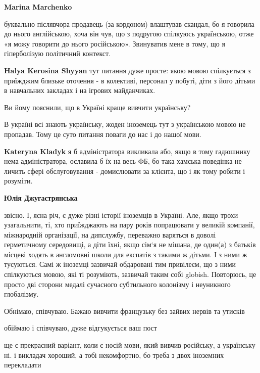 \begin{itemize}
\begin{itemize}
\textbf{Marina Marchenko} 

буквально післявчора продавець (за кордоном) влаштував скандал, бо я говорила
до нього англійською, хоча він чув, що з подругою спілкуюсь українською, отже
«я можу говорити до нього російською». Звинуватив мене в тому, що я
гіперболізую політичний контекст.


\textbf{Halya Kerosina Shyyan} тут питання дуже просте: якою мовою спілкується з приїжджим близьке оточення - в колективі, персонал у побуті, діти з його дітьми в навчальних закладах і на ігрових майданчиках.

Ви йому пояснили, що в Україні краще вивчити українську?

В україні всі знають українську, жоден іноземець тут з українською мовою не пропадав. Тому це суто питання поваги до нас і до нашої мови.

\textbf{Kateryna Kladyk} я б адміністратора викликала або, якщо в тому гадюшнику нема адміністратора, ославила б їх на весь ФБ, бо така хамська поведінка не личить сфері обслуговування - домислювати за клієнта, що і як тому робити і розуміти.

\textbf{Юлія Джугастрянська} 

звісно. І, ясна річ, є дуже різні історії іноземців в Україні. Але, якщо трохи
узагальнити, ті, хто приїжджають на пару років попрацювати у великій компанії,
міжнародній організації, на дипслужбу, переважно варяться в доволі герметичному
середовищі, а діти їхні, якщо сім‘я не мішана, де один(а) з батьків місцеві
ходять в англомовні школи для експатів з такими ж дітьми. І з ними ж тусуються.
Самі ж іноземці зазвичай обдаровані тим привілеєм, що з ними спілкуються мовою,
які ті розуміють, зазвичай таким собі globish. Повторюсь, це просто дві сторони
медалі сучасного субтильного колонізму і неуникного глобалізму.


\end{itemize} %

Обнімаю, співчуваю. Бажаю вивчити французьку без зайвих нервів та утисків

обіймаю і співчуваю, дуже відгукується ваш пост


ще є прекрасний варіант, коли є носій мови, який вивчив російську, а українську
ні. і викладач хороший, а тобі некомфортно, бо треба з двох іноземних
перекладати



\end{itemize}

